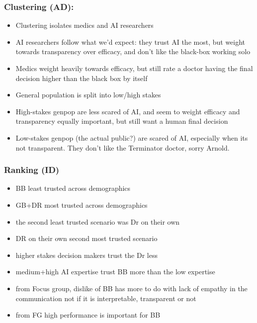 \documentclass[manuscript,screen,review]{acmart}
\begin{document}
\subsubsection{Clustering (AD):}
\begin{itemize}
    \item Clustering isolates medics and AI researchers
    \item AI researchers follow what we'd expect: they trust AI the most, but weight towards transparency over efficacy, and don't like the black-box working solo
    \item Medics weight heavily towards efficacy, but still rate a doctor having the final decision higher than the black box by itself
    \item General population is split into low/high stakes
    \item High-stakes genpop are less scared of AI, and seem to weight efficacy and transparency equally important, but still want a human final decision
    \item Low-stakes genpop (the actual public?) are scared of AI, especially when its not transparent. They don't like the Terminator doctor, sorry Arnold.
\end{itemize}


\subsubsection{Ranking (ID)}
\begin{itemize}
    \item BB least trusted across demographics
    \item GB+DR most trusted across demographics
    \item the second least trusted scenario was Dr on their own
    \item DR on their own second most trusted scenario
    \item higher stakes decision makers trust the Dr less
    \item medium+high AI expertise trust BB more than the low expertise
    \item from Focus group, dislike of BB has more to do with lack of empathy in the communication not if it is interpretable, transparent or not
    \item from FG high performance is important for BB
\end{itemize}
\end{document}
